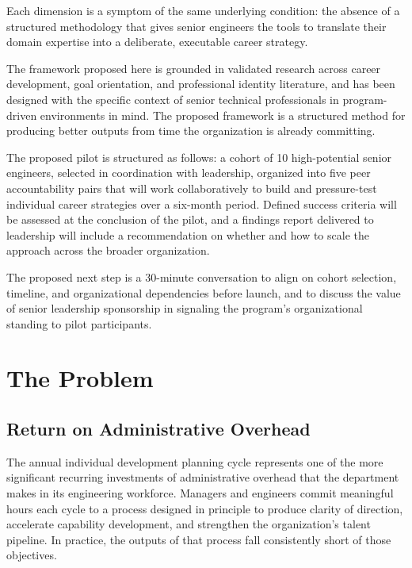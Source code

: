 \documentclass{article}
\begin{document}
Each dimension is a symptom of the same underlying condition: the 
absence of a structured methodology that gives senior engineers the tools to translate 
their domain expertise into a deliberate, executable career strategy. 

The framework proposed here is grounded in validated research across career
development, goal orientation, and professional identity literature, and has been
designed with the specific context of senior technical professionals in
program-driven environments in mind.  The proposed framework is a structured method 
for producing better outputs from time the organization is already committing. 

The proposed pilot is structured as follows: a cohort of 10 high-potential senior
engineers, selected in coordination with leadership, organized into five peer
accountability pairs that will work collaboratively to build and
pressure-test individual career strategies over a six-month period. 
Defined success criteria will be assessed at the
conclusion of the pilot, and a findings report delivered to leadership will
include a recommendation on whether and how to scale the approach across the
broader organization.

The proposed next step is a 30-minute conversation to align on cohort selection,
timeline, and organizational dependencies before launch, and to discuss the
value of senior leadership sponsorship in signaling the program's organizational standing
to pilot participants.

\section{The Problem}

\subsection{Return on Administrative Overhead}

The annual individual development planning cycle represents one of the more
significant recurring investments of administrative overhead that the department 
makes in its engineering workforce. Managers and engineers commit
meaningful hours each cycle to a process designed in principle to produce
clarity of direction, accelerate capability development, and strengthen the
organization's talent pipeline. In practice, the outputs of that process fall
consistently short of those objectives.
\end{document}
